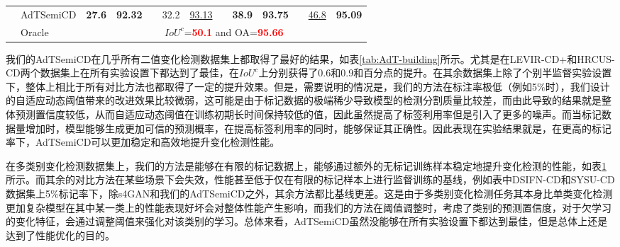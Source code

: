 \documentclass[lang=chs, degree=master, blindreview=false, adobe=false]{yanputhesis}
\begin{document}
\begin{table}[!htbp]
{\begin{tabular}{p{20mm}p{25mm}p{8mm}p{8mm}cp{8mm}p{8mm}cp{8mm}p{8mm}cp{8mm}p{8mm}}
      \rowcolor{mycyan}
      \multirow{-8}{*}{\cellcolor{white}}& \cellcolor{white}
      AdTSemiCD   &   \textbf{27.6} & \textbf{92.32} && \cellcolor{white}32.2 & \cellcolor{white}\underline{93.13} && \textbf{38.9} & \textbf{93.75} && \cellcolor{white}\underline{46.8} & \textbf{95.09} \\%
      \cline{2-13}
      & Oracle & \multicolumn{11}{c}{$ IoU^c$=\textcolor{red}{\bf 50.1} and OA=\textcolor{red}{\bf 95.66}} \\
      \bottomrule
  \end{tabular}
  }
  \label{tab:AdT-mutil}
\end{table}

我们的AdTSemiCD在几乎所有二值变化检测数据集上都取得了最好的结果，如表\ref{tab:AdT-building}所示。尤其是在LEVIR-CD+和HRCUS-CD两个数据集上在所有实验设置下都达到了最佳，在$IoU^c$上分别获得了0.6和0.9和百分点的提升。在其余数据集上除了个别半监督实验设置下，整体上相比于所有对比方法也都取得了一定的提升效果。但是，需要说明的情况是，我们的方法在标注率极低（例如5$\%$时），我们设计的自适应动态阈值带来的改进效果比较微弱，这可能是由于标记数据的极端稀少导致模型的检测分割质量比较差，而由此导致的结果就是整体预测置信度较低，从而自适应动态阈值在训练初期长时间保持较低的值，因此虽然提高了标签利用率但是引入了更多的噪声。而当标记数据量增加时，模型能够生成更加可信的预测概率，在提高标签利用率的同时，能够保证其正确性。因此表现在实验结果就是，在更高的标记率下，AdTSemiCD可以更加稳定和高效地提升变化检测性能。

在多类别变化检测数据集上，我们的方法是能够在有限的标记数据上，能够通过额外的无标记训练样本稳定地提升变化检测的性能，如表\ref{tab:AdT-mutil}所示。而其余的对比方法在某些场景下会失效，性能甚至低于仅在有限的标记样本上进行监督训练的基线，例如表中DSIFN-CD和SYSU-CD数据集上5$\%$标记率下，除s4GAN和我们的AdTSemiCD之外，其余方法都比基线更差。这是由于多类别变化检测任务其本身比单类变化检测更加复杂模型在其中某一类上的性能表现好坏会对整体性能产生影响，而我们的方法在阈值调整时，考虑了类别的预测置信度，对于欠学习的变化特征，会通过调整阈值来强化对该类别的学习。总体来看，AdTSemiCD虽然没能够在所有实验设置下都达到最佳，但是总体上还是达到了性能优化的目的。
\end{document}
